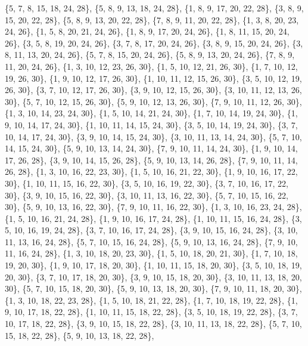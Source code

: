 \documentclass[11pt,a4paper]{article}
\begin{document}
{\{5, 7, 8, 15, 18, 24, 28\}, \{5, 8, 9, 13, 18, 24, 28\}, \{1, 8, 9, 17, 20, 22, 28\}, \{3, 8, 9, 15, 20, 22, 28\}, \{5, 8, 9, 13, 20, 22, 28\},
\{7, 8, 9, 11, 20, 22, 28\}, \{1, 3, 8, 20, 23, 24, 26\}, \{1, 5, 8, 20, 21, 24, 26\}, \{1, 8, 9, 17, 20, 24, 26\}, \{1, 8, 11, 15, 20, 24, 26\},
\{3, 5, 8, 19, 20, 24, 26\}, \{3, 7, 8, 17, 20, 24, 26\}, \{3, 8, 9, 15, 20, 24, 26\}, \{3, 8, 11, 13, 20, 24, 26\}, \{5, 7, 8, 15, 20, 24, 26\},
\{5, 8, 9, 13, 20, 24, 26\}, \{7, 8, 9, 11, 20, 24, 26\}, \{1, 3, 10, 12, 23, 26, 30\}, \{1, 5, 10, 12, 21, 26, 30\}, \{1, 7, 10, 12, 19, 26, 30\},
\{1, 9, 10, 12, 17, 26, 30\}, \{1, 10, 11, 12, 15, 26, 30\}, \{3, 5, 10, 12, 19, 26, 30\}, \{3, 7, 10, 12, 17, 26, 30\}, \{3, 9, 10, 12, 15, 26, 30\},
\{3, 10, 11, 12, 13, 26, 30\}, \{5, 7, 10, 12, 15, 26, 30\}, \{5, 9, 10, 12, 13, 26, 30\}, \{7, 9, 10, 11, 12, 26, 30\}, \{1, 3, 10, 14, 23, 24, 30\},
\{1, 5, 10, 14, 21, 24, 30\}, \{1, 7, 10, 14, 19, 24, 30\}, \{1, 9, 10, 14, 17, 24, 30\}, \{1, 10, 11, 14, 15, 24, 30\}, \{3, 5, 10, 14, 19, 24, 30\},
\{3, 7, 10, 14, 17, 24, 30\}, \{3, 9, 10, 14, 15, 24, 30\}, \{3, 10, 11, 13, 14, 24, 30\}, \{5, 7, 10, 14, 15, 24, 30\}, \{5, 9, 10, 13, 14, 24, 30\},
\{7, 9, 10, 11, 14, 24, 30\}, \{1, 9, 10, 14, 17, 26, 28\}, \{3, 9, 10, 14, 15, 26, 28\}, \{5, 9, 10, 13, 14, 26, 28\}, \{7, 9, 10, 11, 14, 26, 28\},
\{1, 3, 10, 16, 22, 23, 30\}, \{1, 5, 10, 16, 21, 22, 30\}, \{1, 9, 10, 16, 17, 22, 30\}, \{1, 10, 11, 15, 16, 22, 30\}, \{3, 5, 10, 16, 19, 22, 30\},
\{3, 7, 10, 16, 17, 22, 30\}, \{3, 9, 10, 15, 16, 22, 30\}, \{3, 10, 11, 13, 16, 22, 30\}, \{5, 7, 10, 15, 16, 22, 30\}, \{5, 9, 10, 13, 16, 22, 30\},
\{7, 9, 10, 11, 16, 22, 30\}, \{1, 3, 10, 16, 23, 24, 28\}, \{1, 5, 10, 16, 21, 24, 28\}, \{1, 9, 10, 16, 17, 24, 28\}, \{1, 10, 11, 15, 16, 24, 28\},
\{3, 5, 10, 16, 19, 24, 28\}, \{3, 7, 10, 16, 17, 24, 28\}, \{3, 9, 10, 15, 16, 24, 28\}, \{3, 10, 11, 13, 16, 24, 28\}, \{5, 7, 10, 15, 16, 24, 28\},
\{5, 9, 10, 13, 16, 24, 28\}, \{7, 9, 10, 11, 16, 24, 28\}, \{1, 3, 10, 18, 20, 23, 30\}, \{1, 5, 10, 18, 20, 21, 30\}, \{1, 7, 10, 18, 19, 20, 30\},
\{1, 9, 10, 17, 18, 20, 30\}, \{1, 10, 11, 15, 18, 20, 30\}, \{3, 5, 10, 18, 19, 20, 30\}, \{3, 7, 10, 17, 18, 20, 30\}, \{3, 9, 10, 15, 18, 20, 30\},
\{3, 10, 11, 13, 18, 20, 30\}, \{5, 7, 10, 15, 18, 20, 30\}, \{5, 9, 10, 13, 18, 20, 30\}, \{7, 9, 10, 11, 18, 20, 30\}, \{1, 3, 10, 18, 22, 23, 28\},
\{1, 5, 10, 18, 21, 22, 28\}, \{1, 7, 10, 18, 19, 22, 28\}, \{1, 9, 10, 17, 18, 22, 28\}, \{1, 10, 11, 15, 18, 22, 28\}, \{3, 5, 10, 18, 19, 22, 28\},
\{3, 7, 10, 17, 18, 22, 28\}, \{3, 9, 10, 15, 18, 22, 28\}, \{3, 10, 11, 13, 18, 22, 28\}, \{5, 7, 10, 15, 18, 22, 28\}, \{5, 9, 10, 13, 18, 22, 28\},
}
\end{document}
